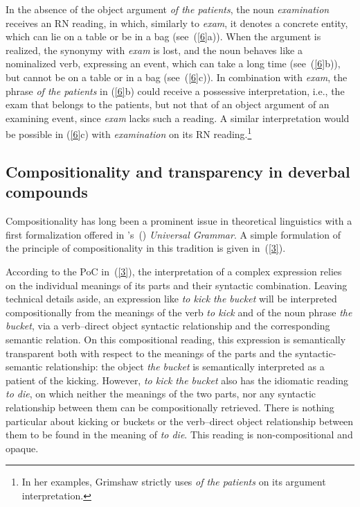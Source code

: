 \documentclass[output=paper]{langsci/langscibook}
\begin{document}
In the absence of the object argument \textit{of the patients}, the noun \textit{examination} receives an RN reading, in which, similarly to \textit{exam}, it denotes a concrete entity, which can lie on a table  {or be in a bag} (see~(\ref{6}a)). When the argument is realized, the synonymy with \textit{exam} is lost, and the noun behaves like a nominalized verb, expressing an event, which can take a long time (see~(\ref{6}b)), but cannot be on a table or in a bag (see~(\ref{6}c)).  {In combination with \textit{exam}, the phrase \textit{of the patients} in (\ref{6}b) could receive a possessive interpretation, i.e., the exam that belongs to the patients, but not that of an object argument of an examining event, since \textit{exam} lacks such a reading. A similar interpretation would be possible in (\ref{6}c) with \textit{examination} on its RN reading.}\footnote{In her examples, Grimshaw strictly uses \textit{of the patients} on its argument interpretation.}





\subsection{Compositionality and transparency in deverbal compounds}\label{sec:intro:compositionality}

Compositionality has long been a prominent issue in theoretical linguistics with a first formalization offered in \citeauthor{montague:70}'s~(\citeyear{montague:70}) \textit{Universal Grammar}.
A simple formulation of the principle of compositionality in this tradition  {is given in~(\ref{3})}.

\begin{exe}
\end{exe}

According to the PoC in~(\ref{3}), the interpretation of a complex expression relies on the individual meanings of its parts and their syntactic combination. Leaving technical details aside, an expression like \textit{to kick the bucket} will be interpreted compositionally from the meanings of the verb \textit{to kick} and of the noun phrase \textit{the bucket}, via a verb--direct object syntactic relationship and the corresponding semantic relation. On this compositional reading, this expression is semantically transparent both with respect to the  meanings of the parts and the syntactic-semantic relationship: the object \textit{the bucket} is semantically interpreted as a patient of the kicking. However, \textit{to kick the bucket} also has the idiomatic reading \textit{to die}, on which neither the meanings of the two parts, nor any syntactic relationship between them can be compositionally retrieved. There is nothing particular about kicking or buckets or the verb--direct object relationship between them to be found in the meaning of \textit{to die}. This reading is non-compositional and  opaque.
\end{document}

